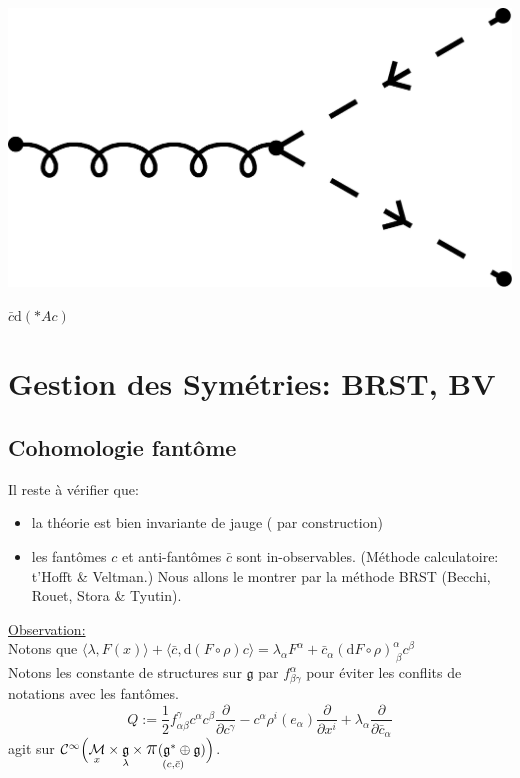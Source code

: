 \documentclass[a4paper,11pt]{article}
\renewcommand{\d}{{\mathrm{d}}}
\newcommand{\dr}[2]{\frac{\partial {#1}}{\partial{#2}}}
\newcommand{\ppi}{{\mathlarger{\mathlarger{\mathlarger{\pi}}}}}
\begin{document}
\begin{minipage}{.2\textwidth}
	\includegraphics[width=\textwidth]{Drawings/Draw_0.pdf}
\end{minipage}
\begin{minipage}{.3\textwidth}
	$\bar c \d (*A c)$
\end{minipage}


\section{Gestion des Symétries: BRST, BV}
\subsection{Cohomologie fantôme}
\noindent Il reste à vérifier que:
\begin{itemize}
\item la théorie est bien invariante de jauge (\color{Green}\checkmark\color{black} par construction)
\item les fantômes $c$ et anti-fantômes $\bar c$ sont in-observables. (Méthode calculatoire: t'Hofft \& Veltman.) Nous allons le montrer par la méthode BRST (Becchi, Rouet, Stora \& Tyutin).
\end{itemize}
\underline{Observation:}\\
Notons que $\langle\lambda,F(x)\rangle + \langle\bar c, \d(F\circ\rho)c\rangle = \lambda_\alpha F^\alpha+\bar c_\alpha(\d F\circ\rho)^\alpha_{\;\beta} c^\beta$\\
Notons les constante de structures sur $\mathfrak{g}$ par $f^\alpha_{\beta\gamma}$ pour éviter les conflits de notations avec les fantômes.
$$\boxed{
Q:=\frac12 f^\gamma_{\alpha\beta} c^\alpha c^\beta\dr{}{c^\gamma} - c^\alpha\rho^i(e_\alpha)\dr{}{x^i}+\lambda_\alpha\dr{}{\bar c_\alpha}
}$$
agit sur $\mathcal{C}^\infty\Big(\underset x {\mathcal M}\times \underset \lambda {\mathfrak g} \times \underset{(c,\bar c)} {\ppi(\mathfrak g^*\oplus\mathfrak g})\Big) $.\\
\end{document}
